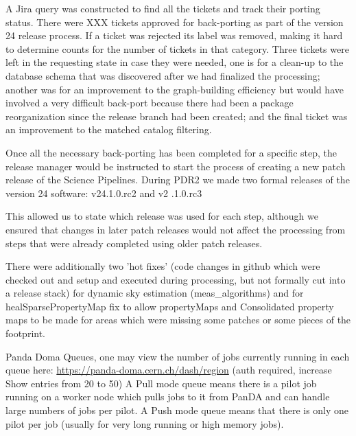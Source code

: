 A Jira query was constructed to find all the tickets and track their porting status.
There were XXX tickets approved for back-porting as part of the version 24 release process.
If a ticket was rejected its label was removed, making it hard to determine counts for the number of tickets in that category.
Three tickets were left in the requesting state in case they were needed, one is for a clean-up to the database schema that was discovered after we had finalized the processing; another was for an improvement to the graph-building efficiency but would have involved a very difficult back-port because there had been a package reorganization since the release branch had been created; and the final ticket was an improvement to the matched catalog filtering.

Once all the necessary back-porting has been completed for a specific step, the release manager would be instructed to start the process of creating a new patch release of the Science Pipelines.
During PDR2 we made two formal releases of the version 24 software: v24.1.0.rc2 and v2 .1.0.rc3

This allowed us to state which release was used for each step, although we ensured that changes in later patch releases would not affect the processing from steps that were already completed using older patch releases.

There were additionally two 'hot fixes' (code changes in github which were
checked out and setup and executed during processing, but not formally
cut into a release stack)
for dynamic sky estimation (meas\_algorithms)
and for healSparsePropertyMap fix to allow propertyMaps and Consolidated property maps to be made for areas which were missing some patches or some pieces
of the footprint.

Panda Doma Queues, one may view the number of jobs currently running in each queue here:
\url{https://panda-doma.cern.ch/dash/region} (auth required, increase Show entries from 20 to 50)
A Pull mode queue means there is a pilot job running on a worker node which pulls jobs to it from PanDA and
can handle large numbers of jobs per pilot.  A Push mode queue means that there is only one pilot per
job (usually for very long running or high memory jobs). 


